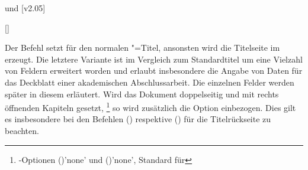 \begin{Declaration*}{}
\begin{Declaration*}{}
\begin{Declaration*}{}
 und 
  [v2.05]
\begin{Declaration}{[]}
\begin{Declaration}[v2.02]{%
}
\begin{Declaration}[v2.02]{}{%
}
\begin{Declaration}[v2.03]{}{%
}
\begin{Declaration}[v2.03]{}{%
}
\begin{Declaration}[v2.03]{%
}{}
\begin{Declaration}[v2.03]{%
}{}
\begin{Declaration}[v2.03]{}{%
}
\begin{Declaration}[v2.03]{}{%
}
\begin{Declaration}[v2.03]{}{%
}
\printdeclarationlist%
%
%
%
Der Befehl  setzt für  den normalen 
\KOMAScript"=Titel{}, ansonsten wird die Titelseite im \TUDCD erzeugt. Die 
letztere Variante ist im Vergleich zum Standardtitel um eine Vielzahl von 
Feldern erweitert worden und erlaubt insbesondere die Angabe von Daten für das 
Deckblatt einer akademischen Abschlussarbeit. Die einzelnen Felder werden 
später in diesem \autorefname erläutert. Wird das Dokument doppelseitig und mit 
rechts öffnenden Kapiteln gesetzt,%
\footnote{%
  \KOMAScript-Optionen ()'none' und 
  ()'none', Standard für 
}
so wird zusätzlich die Option  einbezogen. Dies gilt es 
insbesondere bei den Befehlen () 
respektive () für die Titelrückseite 
zu beachten.


\end{Declaration}
\end{Declaration}
\end{Declaration}
\end{Declaration}
\end{Declaration}
\end{Declaration}
\end{Declaration}
\end{Declaration}
\end{Declaration}
\end{Declaration}
\end{Declaration*}
\end{Declaration*}
\end{Declaration*}
